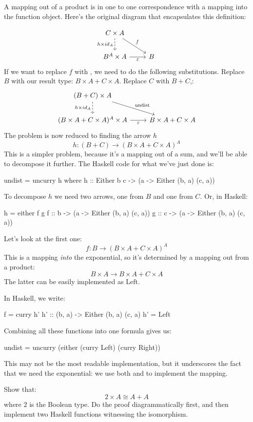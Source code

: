 \documentclass[DaoFP]{subfiles}
\begin{document}
A mapping out of a product is in one to one correspondence with a mapping into the function object. Here's the original diagram that encapsulates this definition:

\[
 \begin{tikzcd}
 C \times A
 \arrow[d, dashed, "h \times id_A"']
 \arrow[rd, "f"]
 \\
 B^A \times A
 \arrow[r, "\varepsilon"']
& B
 \end{tikzcd}
\]
If we want to replace $f$ with , we need to do the following substitutions. Replace $B$ with our result type: $B \times A + C \times A$. Replace $C$ with $B + C$,:
\[
 \begin{tikzcd}
 (B+C) \times A
 \arrow[d, dashed, "h \times id_A"']
 \arrow[rd, "\text{undist}"]
 \\
 (B \times A + C \times A)^A \times A
 \arrow[r, "\varepsilon"']
& B \times A + C \times A
 \end{tikzcd}
\]
The problem is now reduced to finding the arrow $h$
\[ h \colon (B + C) \to  (B \times A + C \times A)^A \]
This is a simpler problem, because it's a mapping out of a sum, and we'll be able to decompose it further. The Haskell code for what we've just done is:
\begin{haskell}
undist = uncurry h
  where
    h :: Either b c -> (a -> Either (b, a) (c, a))
\end{haskell}
To decompose $h$ we need two arrows, one from $B$ and one from $C$. Or, in Haskell:

\begin{haskell}
    h = either f g
    f :: b -> (a -> Either (b, a) (c, a))
    g :: c -> (a -> Either (b, a) (c, a))
\end{haskell}
Let's look at the first one:
\[f \colon B \to (B \times A + C \times A)^A \]
This is a mapping \emph{into} the exponential, so it's determined by a mapping out from a product:
\[ B \times A \to B \times A + C \times A \]
The latter can be easily implemented as $\text{Left}$.

In Haskell, we write:
\begin{haskell}
    f = curry h'
    h' :: (b, a) -> Either (b, a) (c, a)
    h'  = Left
\end{haskell}

Combining all these functions into one formula gives us:
\begin{haskell}
undist = uncurry (either (curry Left) (curry Right))
\end{haskell}
This may not be the most readable implementation, but it underscores the fact that we need the exponential: we use both  and  to implement the mapping.

\begin{exercise}
Show that:
\[ 2 \times A \cong A + A \]
where $2$ is the Boolean type. Do the proof diagrammatically first, and then implement two Haskell functions witnessing the isomorphism.
\end{exercise}
\end{document}
